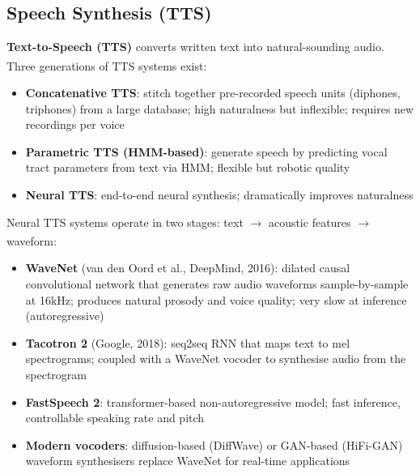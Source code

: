\subsection{Speech Synthesis (TTS)}

\begin{tcbitemize}[ skin=sectionraster ]
    \tcbitem[title={Classical and Neural TTS}, raster multicolumn=3]
    \textbf{Text-to-Speech (TTS)} converts written text into natural-sounding audio.
    Three generations of TTS systems exist\textsuperscript{\cite[][p.~11]{dhamaniIntroductionGenerativeAI2024}}:
    \begin{itemize}
        \item \textbf{Concatenative TTS}: stitch together pre-recorded speech units (diphones, triphones) from a large database; high naturalness but inflexible; requires new recordings per voice
        \item \textbf{Parametric TTS (HMM-based)}: generate speech by predicting vocal tract parameters from text via HMM; flexible but robotic quality
        \item \textbf{Neural TTS}: end-to-end neural synthesis; dramatically improves naturalness
    \end{itemize}

    \tcbitem[title={Neural TTS: WaveNet and Tacotron}, raster multicolumn=3]
    Neural TTS systems operate in two stages: text $\to$ acoustic features $\to$ waveform\textsuperscript{\cite[][p.~11]{dhamaniIntroductionGenerativeAI2024}}:
    \begin{itemize}
        \item \textbf{WaveNet} (van den Oord et al., DeepMind, 2016): dilated causal convolutional network that generates raw audio waveforms sample-by-sample at 16kHz; produces natural prosody and voice quality; very slow at inference (autoregressive)
        \item \textbf{Tacotron 2} (Google, 2018): seq2seq RNN that maps text to mel spectrograms; coupled with a WaveNet vocoder to synthesise audio from the spectrogram
        \item \textbf{FastSpeech 2}: transformer-based non-autoregressive model; fast inference, controllable speaking rate and pitch
        \item \textbf{Modern vocoders}: diffusion-based (DiffWave) or GAN-based (HiFi-GAN) waveform synthesisers replace WaveNet for real-time applications
    \end{itemize}
\end{tcbitemize}

